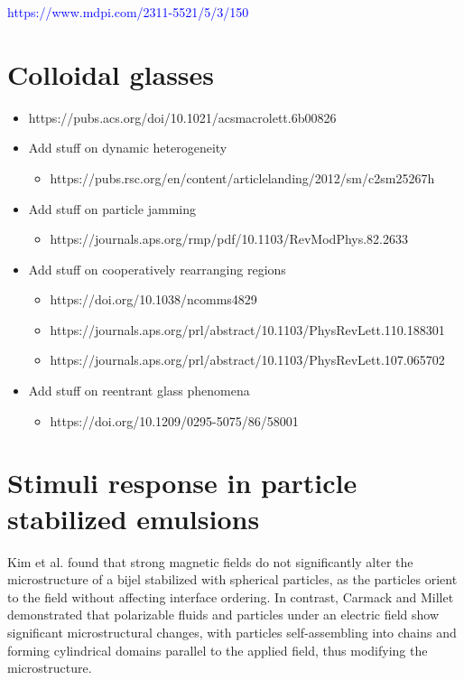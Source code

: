 \textcolor{blue}{https://www.mdpi.com/2311-5521/5/3/150}

\section{Colloidal glasses}

\begin{itemize}
    \item https://pubs.acs.org/doi/10.1021/acsmacrolett.6b00826
    \item Add stuff on dynamic heterogeneity
    \begin{itemize}
        \item https://pubs.rsc.org/en/content/articlelanding/2012/sm/c2sm25267h
    \end{itemize}
    \item Add stuff on particle jamming
    \begin{itemize}
        \item https://journals.aps.org/rmp/pdf/10.1103/RevModPhys.82.2633
    \end{itemize}
    \item Add stuff on cooperatively rearranging regions
        \begin{itemize}
            \item https://doi.org/10.1038/ncomms4829
            \item https://journals.aps.org/prl/abstract/10.1103/PhysRevLett.110.188301
            \item https://journals.aps.org/prl/abstract/10.1103/PhysRevLett.107.065702
        \end{itemize}
    \item Add stuff on reentrant glass phenomena 
    \begin{itemize}
        \item https://doi.org/10.1209/0295-5075/86/58001
    \end{itemize}
\end{itemize}

\section{Stimuli response in particle stabilized emulsions}

Kim et al. found that strong magnetic fields do not significantly alter the microstructure of a bijel stabilized with spherical particles, as the particles orient 
to the field without affecting interface ordering. \cite{kim_bijels_2010} In contrast, Carmack and Millet demonstrated that polarizable fluids and particles under 
an electric field show significant microstructural changes, with particles self-assembling into chains and forming cylindrical domains parallel to the applied field, 
thus modifying the microstructure. \cite{carmack_tuning_2018}

